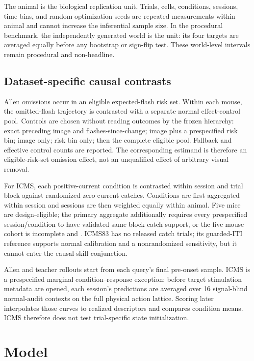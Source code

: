 \documentclass[11pt]{article}
\begin{document}
The animal is the biological replication unit. Trials, cells, conditions,
sessions, time bins, and random optimization seeds are repeated measurements
within animal and cannot increase the inferential sample size. In the
procedural benchmark, the independently generated world is the unit: its four
targets are averaged equally before any bootstrap or sign-flip test. These
world-level intervals remain procedural and non-headline.

\subsection{Dataset-specific causal contrasts}

Allen omissions occur in an eligible expected-flash risk set. Within each
mouse, the omitted-flash trajectory is contrasted with a separate normal
effect-control pool. Controls are chosen without reading outcomes by the
frozen hierarchy: exact preceding image and flashes-since-change; image plus a
prespecified risk bin; image only; risk bin only; then the complete eligible
pool. Fallback and effective control counts are reported. The corresponding
estimand is therefore an eligible-risk-set omission effect, not an
unqualified effect of arbitrary visual removal.

For ICMS, each positive-current condition is contrasted within session and
trial block against randomized zero-current catches. Conditions are first
aggregated within session and sessions are then weighted equally within
animal. Five mice are design-eligible; the primary aggregate additionally
requires every prespecified session/condition to have validated same-block
catch support, or the five-mouse cohort is incomplete and \NotEvaluated{}.
ICMS83 has no
released catch trials; its guarded-ITI reference supports normal calibration
and a nonrandomized sensitivity, but it cannot enter the causal-skill
conjunction.

Allen and teacher rollouts start from each query's final pre-onset sample.
ICMS is a prespecified marginal condition--response exception: before target
stimulation metadata are opened, each session's predictions are averaged over
16 signal-blind normal-audit contexts on the full physical action lattice.
Scoring later interpolates those curves to realized descriptors and compares
condition means. ICMS therefore does not test trial-specific state
initialization.

\section{Model}
\label{sec:model}
\end{document}
